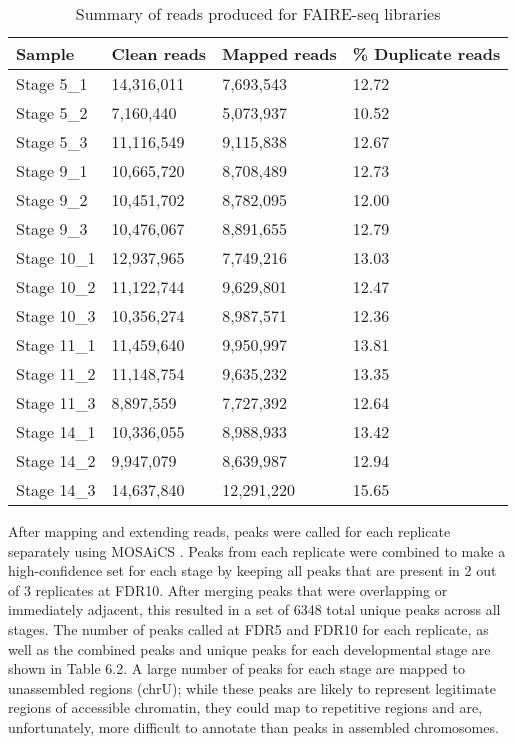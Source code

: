 \begin{table}[h]
\centering
\begin{tabular}{|l|l|l|l|}
\hline
\textbf{Sample}      & \textbf{Clean reads} & \textbf{Mapped reads} & \textbf{\% Duplicate reads} \\ \hline
Stage 5\_1  & 14,316,011    & 7,693,543      & 12.72              \\ \hline
Stage 5\_2  & 7,160,440     & 5,073,937      & 10.52              \\ \hline
Stage 5\_3  & 11,116,549    & 9,115,838      & 12.67              \\ \hline
Stage 9\_1  & 10,665,720    & 8,708,489      & 12.73              \\ \hline
Stage 9\_2  & 10,451,702    & 8,782,095      & 12.00               \\ \hline
Stage 9\_3  & 10,476,067    & 8,891,655      & 12.79              \\ \hline
Stage 10\_1 & 12,937,965    & 7,749,216      & 13.03              \\ \hline
Stage 10\_2 & 11,122,744    & 9,629,801      & 12.47              \\ \hline
Stage 10\_3 & 10,356,274    & 8,987,571      & 12.36              \\ \hline
Stage 11\_1 & 11,459,640    & 9,950,997      & 13.81              \\ \hline
Stage 11\_2 & 11,148,754    & 9,635,232      & 13.35              \\ \hline
Stage 11\_3 & 8,897,559     & 7,727,392      & 12.64              \\ \hline
Stage 14\_1 & 10,336,055    & 8,988,933      & 13.42              \\ \hline
Stage 14\_2 & 9,947,079     & 8,639,987      & 12.94              \\ \hline
Stage 14\_3 & 14,637,840    & 12,291,220     & 15.65              \\  \hline
\end{tabular}
\caption{Summary of reads produced for FAIRE-seq libraries}
\label{Table 6.1}
\end{table}

After mapping and extending reads, peaks were called for each replicate separately using MOSAiCS \citep{chung_mosaics_2012}. Peaks from each replicate were combined to make a high-confidence set for each stage by keeping all peaks that are present in 2 out of 3 replicates at FDR10. After merging peaks that were overlapping or immediately adjacent, this resulted in a set of 6348 total unique peaks across all stages. The number of peaks called at FDR5 and FDR10 for each replicate, as well as the combined peaks and unique peaks for each developmental stage are shown in Table 6.2. A large number of peaks for each stage are mapped to unassembled regions (chrU); while these peaks are likely to represent legitimate regions of accessible chromatin, they could map to repetitive regions and are, unfortunately, more difficult to annotate than peaks in assembled chromosomes.\\

